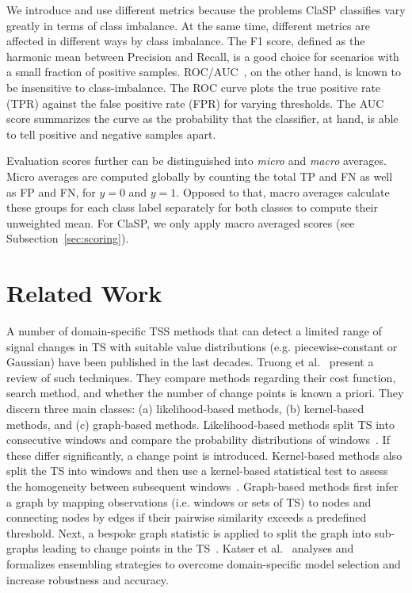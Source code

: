 \documentclass[pdflatex,sn-basic]{sn-jnl}
\begin{document}
We introduce and use different metrics because the problems ClaSP classifies vary greatly in terms of class imbalance. At the same time, different metrics are affected in different ways by class imbalance. The F1 score, defined as the harmonic mean between Precision and Recall, is a good choice for scenarios with a small fraction of positive samples. ROC/AUC~\citep{fawcett2006introduction}, on the other hand, is known to be insensitive to class-imbalance. The ROC curve plots the true positive rate (TPR) against the false positive rate (FPR) for varying thresholds. The AUC score summarizes the curve as the probability that the classifier, at hand, is able to tell positive and negative samples apart. 

Evaluation scores further can be distinguished into \emph{micro} and \emph{macro} averages. Micro averages are computed globally by counting the total TP and FN as well as FP and FN, for $y=0$ and $y=1$. Opposed to that, macro averages calculate these groups for each class label separately for both classes to compute their unweighted mean. For ClaSP, we only apply macro averaged scores (see Subsection~\ref{sec:scoring}). 


\section{Related Work}\label{sec:related_work}

A number of domain-specific TSS methods that can detect a limited range of signal changes in TS with suitable value distributions (e.g. piecewise-constant or Gaussian) have been published in the last decades. Truong et al.~\citep{truong2020selective} present a review of such techniques. They compare methods regarding their cost function, search method, and whether the number of change points is known a priori. They discern three main classes: (a) likelihood-based methods, (b) kernel-based methods, and (c) graph-based methods. Likelihood-based methods split TS into consecutive windows and compare the probability distributions of windows~\citep{kawahara2012sequential}. If these differ significantly, a change point is introduced. Kernel-based methods also split the TS into windows and then use a kernel-based statistical test to assess the homogeneity between subsequent windows~\citep{harchaoui2009regularized}. Graph-based methods first infer a graph by mapping observations (i.e. windows or sets of TS) to nodes and connecting nodes by edges if their pairwise similarity exceeds a predefined threshold. Next, a bespoke graph statistic is applied to split the graph into sub-graphs leading to change points in the TS~\citep{chen2015graph}. Katser et al.~\citep{Katser2021UnsupervisedOC} analyses and formalizes ensembling strategies to overcome domain-specific model selection and increase robustness and accuracy. 
\end{document}
